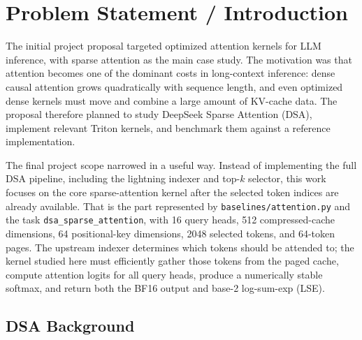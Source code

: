 \documentclass{article}
\begin{document}


\printAffiliationsAndNotice{}  %

\section{Problem Statement / Introduction}
\label{submission}

The initial project proposal targeted optimized attention kernels for LLM inference,
with sparse attention as the main case study. The motivation was that attention becomes
one of the dominant costs in long-context inference: dense causal attention grows
quadratically with sequence length, and even optimized dense kernels must move and
combine a large amount of KV-cache data. The proposal therefore planned to study
DeepSeek Sparse Attention (DSA), implement relevant Triton kernels, and benchmark
them against a reference implementation.

The final project scope narrowed in a useful way. Instead of implementing the full DSA
pipeline, including the lightning indexer and top-$k$ selector, this work focuses on the
core sparse-attention kernel after the selected token indices are already available. That
is the part represented by \texttt{baselines/attention.py} and the task
\texttt{dsa\_sparse\_attention}, with 16 query heads, 512 compressed-cache dimensions,
64 positional-key dimensions, 2048 selected tokens, and 64-token pages. The upstream
indexer determines which tokens should be attended to; the kernel studied here must
efficiently gather those tokens from the paged cache, compute attention logits for all
query heads, produce a numerically stable softmax, and return both the BF16 output and
base-2 log-sum-exp (LSE).

\subsection{DSA Background}
\end{document}
